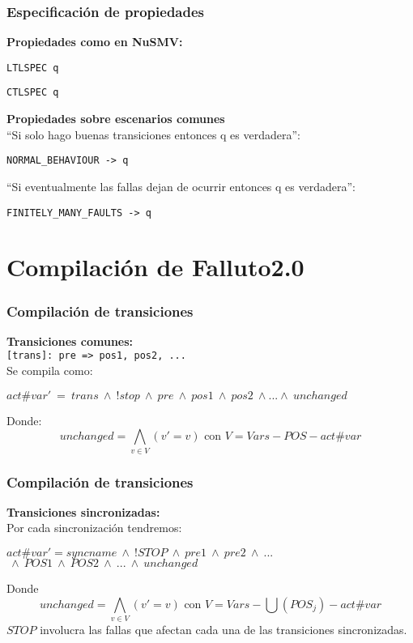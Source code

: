 \documentclass[serif]{beamer}
\begin{document}
\begin{frame}
\frametitle{Especificación de propiedades}
\textbf{Propiedades como en NuSMV:}\\[0.3cm]
\begin{center}\texttt{LTLSPEC q}

\texttt{CTLSPEC q}\end{center}
\textbf{Propiedades sobre escenarios comunes}\\[0.3cm]
``Si solo hago buenas transiciones entonces q es verdadera'':\\[0.2cm]
\begin{center} \texttt{NORMAL\_BEHAVIOUR -> q}\end{center}
``Si eventualmente las fallas dejan de ocurrir entonces q es
verdadera'':\\[0.2cm]
\begin{center} \texttt{FINITELY\_MANY\_FAULTS -> q}\end{center}
\end{frame}


\section{Compilación de Falluto2.0}


\begin{frame}
\frametitle{Compilación de transiciones}
\textbf{\Large Transiciones comunes:}\\[0.3cm]
\texttt{[trans]: pre => pos1, pos2, ...}\\[0.3cm]
Se compila como:
\begin{framed}
$act\#var'~=~trans~\wedge~!stop~\wedge~pre~\wedge~pos1~\wedge~pos2~\wedge...\wedge~unchanged$
\end{framed}
Donde:
$$unchanged = \bigwedge_{v\in V}(v' = v) \text{ con }V = Vars - POS - act\#var$$

\end{frame}


\begin{frame}
\frametitle{Compilación de transiciones}
\textbf{\Large Transiciones sincronizadas:}\\[0.3cm]
Por cada sincronizaci\'on tendremos:
\begin{framed}
$act\#var' = syncname~\wedge~!STOP~\wedge~pre1~\wedge~pre2~\wedge~...$
$~\wedge~POS1~\wedge~POS2~\wedge~...~\wedge~unchanged$\\[0.3cm]
\end{framed}
Donde
$$unchanged = \bigwedge_{v \in V}(v' = v) \text{ con }V = Vars 
- \bigcup (POS_j) - act\#var$$
$STOP$ involucra las fallas que afectan cada una de las 
transiciones sincronizadas.
\end{frame}
\end{document}
